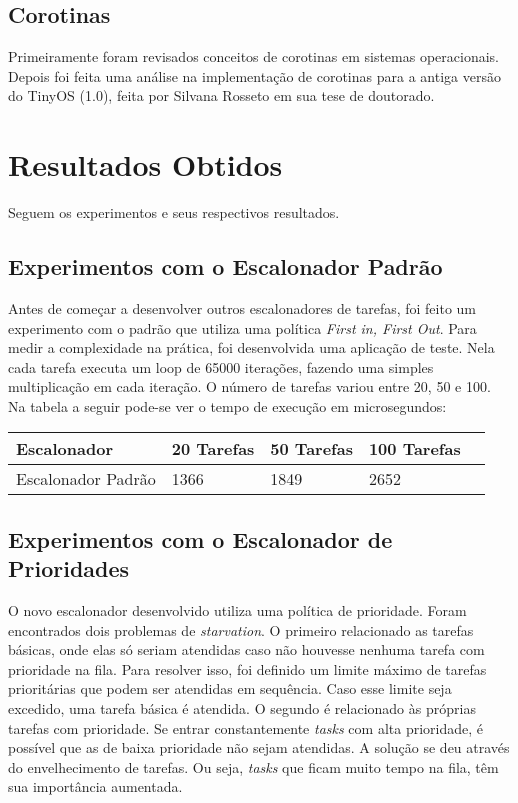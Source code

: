 \documentclass[a4paper,onecolumn, 10pt]{article}
\begin{document}
\subsection{Corotinas}
Primeiramente foram revisados conceitos de corotinas em sistemas operacionais. Depois foi feita uma análise na
implementação de corotinas para a antiga versão do TinyOS (1.0), feita por Silvana Rosseto em sua tese de
doutorado\cite{tesesilvana}.

\pagebreak

\section{Resultados Obtidos}\label{resultados}
Seguem os experimentos e seus respectivos resultados.

\subsection{Experimentos com o Escalonador Padrão}
Antes de começar a desenvolver outros escalonadores de tarefas, foi feito um experimento com o padrão que utiliza uma
política \textit{First in, First Out}.
Para medir a complexidade na prática, foi desenvolvida uma aplicação de teste. Nela cada tarefa executa um loop de 65000
iterações, fazendo uma simples multiplicação em cada iteração. O número de tarefas variou entre 20, 50 e 100.
Na tabela a seguir pode-se ver o tempo de execução em microsegundos:
\begin{center}
    \begin{tabular}{ | l | l | l | l | p{5cm} |}
    \hline
    Escalonador              & 20 Tarefas & 50 Tarefas & 100 Tarefas \\ \hline
    Escalonador Padrão       & 1366 & 1849 & 2652 \\ \hline
    \end{tabular}
\end{center}

\subsection{Experimentos com o Escalonador de Prioridades}
O novo escalonador desenvolvido utiliza uma política de prioridade. Foram encontrados dois problemas de
\textit{starvation}. O primeiro relacionado as tarefas básicas, onde elas só seriam atendidas caso não houvesse 
nenhuma tarefa com prioridade na fila. Para resolver isso, foi definido um limite máximo de tarefas prioritárias 
que podem ser atendidas em sequência. Caso esse limite seja excedido, uma tarefa básica é atendida. O segundo é 
relacionado às próprias tarefas com prioridade. Se entrar constantemente \textit{tasks} com alta prioridade, é 
possível que as de baixa prioridade não sejam atendidas. A solução se deu através do envelhecimento de
tarefas. Ou seja, \textit{tasks} que ficam muito tempo na fila, têm sua importância aumentada.
\end{document}
